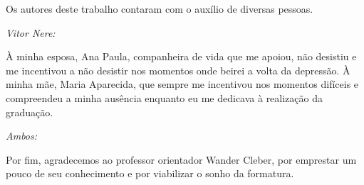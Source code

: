 \begin{agradecimentos}

Os autores deste trabalho contaram com o auxílio de diversas pessoas.

\textit{Vitor Nere:}

À minha esposa, Ana Paula, companheira de vida que me apoiou, não desistiu e
me incentivou a não desistir nos momentos onde beirei a volta da depressão. À minha
mãe, Maria Aparecida, que sempre me incentivou nos momentos difíceis e compreendeu
a minha ausência enquanto eu me dedicava à realização da graduação.

\textit{Ambos:}

Por fim, agradecemos ao professor orientador Wander Cleber, por emprestar um
pouco de seu conhecimento e por viabilizar o sonho da formatura.

\end{agradecimentos}
